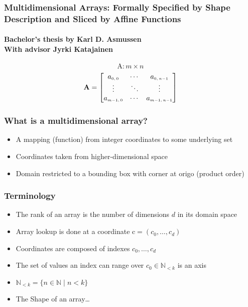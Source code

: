 \documentclass[xetex,mathserif,serif]{beamer}
\newcommand\mrm[1]{\mathrm{#1}}
\newcommand\brm[1]{\bm{\mrm{#1}}}
\newcommand\Nat{\mathbb{N}}
\begin{document}
\begin{frame}
  \frametitle{Multidimensional Arrays: Formally Specified by Shape Description and Sliced by Affine Functions}
  \framesubtitle{Bachelor's thesis by Karl D. Asmussen \\
  With advisor Jyrki Katajainen}
  
  \[
    \bm{\mathrm{A}} : m \times n
  \]
  \[ \bm{\mathrm{A}}=
      \begin{bmatrix}
        a_{\text{\tiny$0,0$}} & \cdots & a_{\text{\tiny$0,n{-}1$}} \\
        \vdots & \ddots & \vdots \\
        a_{\text{\tiny$m{-}1,0$}} & \cdots & a_{\text{\tiny$m{-}1,n{-}1$}}
      \end{bmatrix}
  \]
\end{frame}

\begin{frame}
  \frametitle{What is a multidimensional array?}
  \begin{itemize}%
    \item A mapping (function) from integer coordinates to some underlying set
    \item Coordinates taken from higher-dimensional space
    \item Domain restricted to a bounding box with corner at origo (product order)
  \end{itemize}
\end{frame}

\begin{frame}
  \frametitle{Terminology}
  \begin{itemize}%
    \item The rank of an array is the number of dimensions \(d\) in its domain space
    \item Array lookup is done at a coordinate \(\brm c = (c_0,\dots,c_d)\)
    \item Coordinates are composed of indexes \(c_0,\dots,c_d\)
    \item The set of values an index can range over \(c_0 \in \Nat_{<k}\) is an axis
    \item \(\Nat_{<k} = \{ n \in \Nat \mid n < k \}\)
    \item The Shape of an array\dots
  \end{itemize}
\end{frame}
\end{document}
